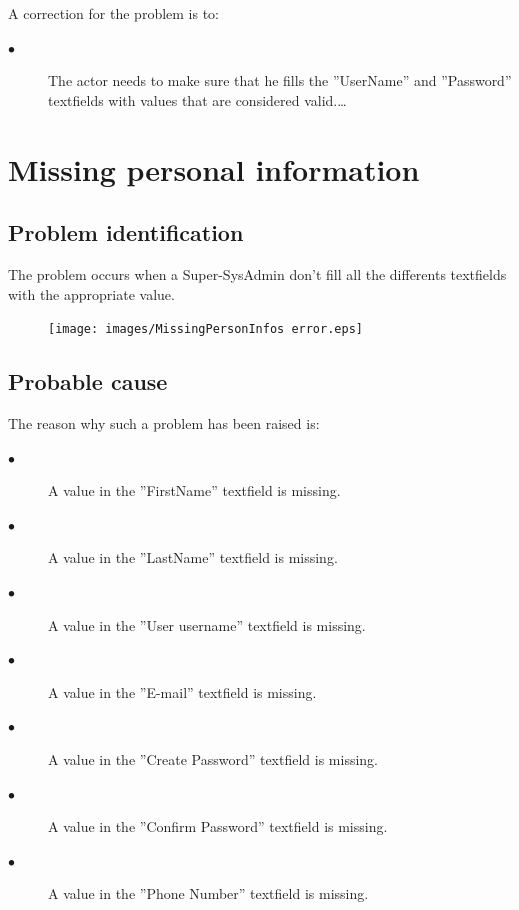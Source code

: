 A correction for the problem is to:\\
\begin{description}
\item[$\bullet$] The actor needs to make sure that he fills the
''UserName'' and ''Password'' textfields with values that are considered
valid.\ldots

\end{description}






\section{Missing personal information} 

\subsection{Problem identification}
The problem occurs when a Super-SysAdmin don't fill all the differents
textfields with the appropriate value.

\begin{figure}[H]
\centering
\texttt{[image: images/MissingPersonInfos error.eps]}
\caption{\label{overflow}}
\end{figure}
\subsection{Probable cause}

The reason why such a problem has been raised is:\\
\begin{description}
\item[$\bullet$] A value in the ''FirstName'' textfield is missing.
\item[$\bullet$] A value in the ''LastName'' textfield is missing.
\item[$\bullet$] A value in the ''User username'' textfield is missing.
\item[$\bullet$] A value in the ''E-mail'' textfield is missing.
\item[$\bullet$] A value in the ''Create Password'' textfield is missing.
\item[$\bullet$] A value in the ''Confirm Password'' textfield is missing.
\item[$\bullet$] A value in the ''Phone Number'' textfield is missing.

\end{description}


